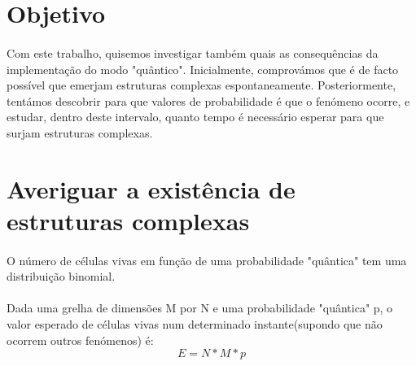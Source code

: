 \documentclass[a4paper,11pt]{book}
\begin{document}
\section{Objetivo}
\paragraph{}Com este trabalho, quisemos investigar também quais as consequências da implementação do modo "quântico". Inicialmente, comprovámos que é de facto possível que emerjam estruturas complexas espontaneamente. Posteriormente, tentámos descobrir para que valores de probabilidade é que o fenómeno ocorre, e estudar, dentro deste intervalo, quanto tempo é necessário esperar para que surjam estruturas complexas.
\section{Averiguar a existência de estruturas complexas}
\paragraph{}O número de células vivas em função de uma probabilidade "quântica" tem uma distribuição binomial.
\paragraph{}Dada uma grelha de dimensões M por N e uma probabilidade "quântica" p, o valor esperado de células vivas num determinado instante(supondo que não ocorrem outros fenómenos) é:
\begin{equation}
    E = N*M*p
\end{equation}
\end{document}
